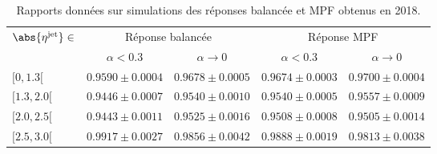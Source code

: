 \begin{table}[h]
\centering
\begin{tabular}{lcccc}
\toprule
\multirow{2}{*}{$\abs{\eta^\text{jet}}\in$} & \multicolumn{2}{c}{Réponse balancée} & \multicolumn{2}{c}{Réponse MPF} \\
\cmidrule(lr){2-3}\cmidrule(lr){4-5}
 & $\alpha<\num{0.3}$ & $\alpha\to0$ & $\alpha<\num{0.3}$ & $\alpha\to0$\\
\midrule
$[\num{0}, \num{1.3}[$ & $\num{0.9590}\pm\num{0.0004}$ & $\num{0.9678}\pm\num{0.0005}$ & $\num{0.9674}\pm\num{0.0003}$ & $\num{0.9700}\pm\num{0.0004}$ \\
$[\num{1.3}, \num{2.0}[$ & $\num{0.9446}\pm\num{0.0007}$ & $\num{0.9540}\pm\num{0.0010}$ & $\num{0.9540}\pm\num{0.0005}$ & $\num{0.9557}\pm\num{0.0009}$ \\
$[\num{2.0}, \num{2.5}[$ & $\num{0.9443}\pm\num{0.0011}$ & $\num{0.9525}\pm\num{0.0016}$ & $\num{0.9508}\pm\num{0.0008}$ & $\num{0.9505}\pm\num{0.0014}$ \\
$[\num{2.5}, \num{3.0}[$ & $\num{0.9917}\pm\num{0.0027}$ & $\num{0.9856}\pm\num{0.0042}$ & $\num{0.9888}\pm\num{0.0019}$ & $\num{0.9813}\pm\num{0.0038}$ \\
\bottomrule
\end{tabular}
\caption{Rapports données sur simulations des réponses balancée et MPF obtenus en 2018.}
\label{tab-responses_recap_table_2018ABCD}
\end{table}